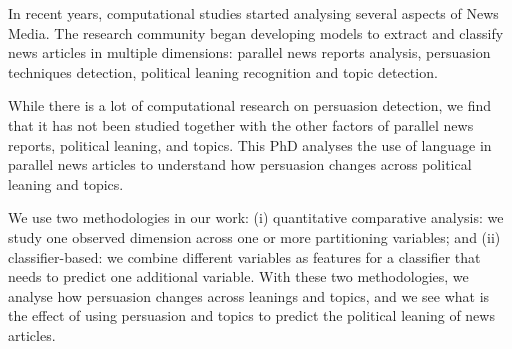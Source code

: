 In recent years, computational studies started analysing several aspects of News Media.
The research community began
developing models to extract and classify news articles in multiple dimensions: parallel news reports analysis, persuasion techniques detection, political leaning recognition and topic detection.

While there is a lot of computational research on persuasion detection, we find that it has not been studied together with the other factors of 
parallel news reports, political leaning, and topics.
%
%
This PhD analyses the use of language in parallel news articles to understand how persuasion changes across political leaning and topics.


We use two methodologies in our work:
(i) quantitative comparative analysis: we study one observed dimension across one or more partitioning variables; and
(ii) classifier-based: we combine different variables as features for a classifier that needs to predict one additional variable.
With these two methodologies, we analyse how persuasion changes across leanings and topics, and we see what is the effect of using persuasion and topics to predict the political leaning of news articles. 


